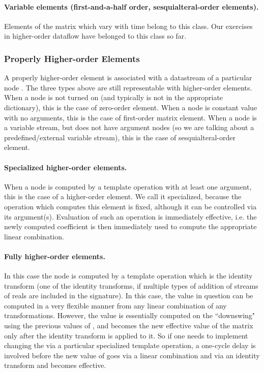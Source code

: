 \documentclass[withtimes]{easychair}
\begin{document}
\paragraph{Variable elements (first-and-a-half order, sesquialteral-order elements).} Elements of the matrix  which vary with
time belong to this class. Our exercises in higher-order dataflow have belonged to this class so far.

\subsubsection{Properly Higher-order Elements}

A properly higher-order element is associated with a datastream of a particular node . The three types
above are still representable with higher-order elements. When a node is not turned on (and typically is
not in the appropriate dictionary), this is the case of zero-order element. When a node is constant value
with no arguments, this is the case of first-order matrix element. When a node is a variable stream, but does not
have argument nodes (so we are talking about a predefined/external variable stream), this is the case of sesquialteral-order element.

\paragraph{Specialized higher-order elements.}

When a node  is computed by a template operation with at least one argument, this is the
case of a higher-order element. We call it specialized, because the operation which computes
this element is fixed, although it can be controlled via its argument(s). Evaluation of such an operation is immediately
effective, i.e. the newly computed coefficient is then immediately used to compute the
appropriate linear combination.

\paragraph{Fully higher-order elements.} In this case the node  is computed by a template operation which
is the identity transform (one of the identity transforms, if multiple types of addition of streams of reals
are included in the signature). In this case, the value in question can be computed in a very flexible
manner from any linear combination of any transformations. However, the value is essentially
computed on the ``downswing" using the previous values of , and becomes the new effective
value of the matrix only after the identity transform is applied to it. So if one needs to implement
changing the  via a particular specialized template operation, a one-cycle delay is
involved before the new value of  goes via a linear combination and via an identity transform and becomes effective.
\end{document}
